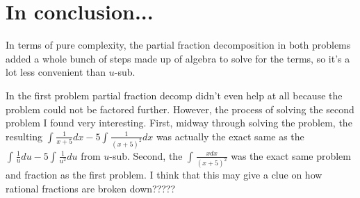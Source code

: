 \documentclass[12pt]{article}
\begin{document}
\section{In conclusion...}
In terms of pure complexity, the partial fraction decomposition in both problems added a whole bunch of steps made up of algebra to solve for the terms, so it's a lot less convenient than $u$-sub. 

In the first problem partial fraction decomp didn't even help at all because the problem could not be factored further. However, the process of solving the second problem I found very interesting. First, midway through solving the problem, the resulting $\int_{ }^{ }\frac{1}{x+5}dx-5\int_{ }^{ }\frac{1}{\left(x+5\right)^{2}}dx$ was actually the exact same as the $\int_{ }^{ }\frac{1}{u}du-5\int_{ }^{ }\frac{1}{u^{2}}du$ from $u$-sub. Second, the $\int_{ }^{ }\frac{xdx}{\left(x+5\right)^{2}}$ was the exact same problem and fraction as the first problem. I think that this may give a clue on how rational fractions are broken down?????
\end{document}
